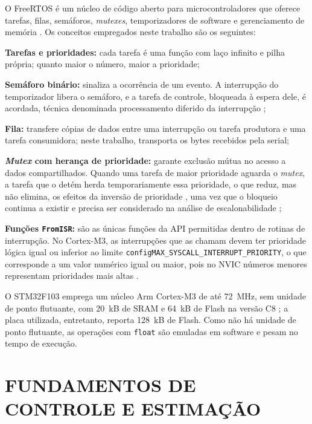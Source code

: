 O FreeRTOS é um núcleo de código aberto para microcontroladores que oferece tarefas, filas, semáforos, \textit{mutexes}, temporizadores de software e gerenciamento de memória \cite{freertosmanual,barry2016}. Os conceitos empregados neste trabalho são os seguintes:

\begin{alineastcc}
 \item \textbf{Tarefas e prioridades:} cada tarefa é uma função com laço infinito e pilha própria; quanto maior o número, maior a prioridade;
 \item \textbf{Semáforo binário:} sinaliza a ocorrência de um evento. A interrupção do temporizador libera o semáforo, e a tarefa de controle, bloqueada à espera dele, é acordada, técnica denominada processamento diferido da interrupção \cite{barry2016};
 \item \textbf{Fila:} transfere cópias de dados entre uma interrupção ou tarefa produtora e uma tarefa consumidora; neste trabalho, transporta os bytes recebidos pela serial;
 \item \textbf{\textit{Mutex} com herança de prioridade:} garante exclusão mútua no acesso a dados compartilhados. Quando uma tarefa de maior prioridade aguarda o \textit{mutex}, a tarefa que o detém herda temporariamente essa prioridade, o que reduz, mas não elimina, os efeitos da inversão de prioridade \cite{barry2016}, uma vez que o bloqueio continua a existir e precisa ser considerado na análise de escalonabilidade \cite[p.~384--385]{burns2009};
 \item \textbf{Funções \texttt{FromISR}:} são as únicas funções da API permitidas dentro de rotinas de interrupção. No Cortex-M3, as interrupções que as chamam devem ter prioridade lógica igual ou inferior ao limite \texttt{configMAX\_SYSCALL\_INTERRUPT\_PRIORITY}, o que corresponde a um valor numérico igual ou maior, pois no NVIC números menores representam prioridades mais altas \cite{freertoscortex}.
\end{alineastcc}

O STM32F103 emprega um núcleo Arm Cortex-M3 de até 72~MHz, sem unidade de ponto flutuante, com 20~kB de SRAM e 64~kB de Flash na versão C8 \cite{stm32f103ds}; a placa utilizada, entretanto, reporta 128~kB de Flash. Como não há unidade de ponto flutuante, as operações com \texttt{float} são emuladas em software e pesam no tempo de execução.

\section{FUNDAMENTOS DE CONTROLE E ESTIMAÇÃO}

